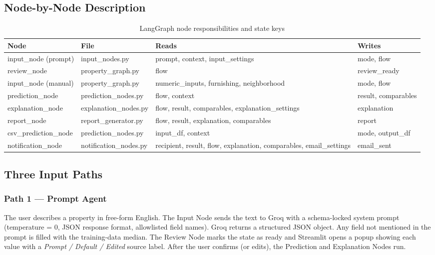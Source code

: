 \documentclass[12pt,a4paper]{article}
\begin{document}
\subsection{Node-by-Node Description}

\begin{table}[H]
\centering
\caption{LangGraph node responsibilities and state keys}
\begin{tabularx}{\linewidth}{llXX}
\toprule
\textbf{Node} & \textbf{File} & \textbf{Reads} & \textbf{Writes} \\
\midrule
input\_node (prompt) & input\_nodes.py & prompt, context, input\_settings & mode, flow \\
review\_node & property\_graph.py & flow & review\_ready \\
input\_node (manual) & property\_graph.py & numeric\_inputs, furnishing, neighborhood & mode, flow \\
prediction\_node & prediction\_nodes.py & flow, context & result, comparables \\
explanation\_node & explanation\_nodes.py & flow, result, comparables, explanation\_settings & explanation \\
report\_node & report\_generator.py & flow, result, explanation, comparables & report \\
csv\_prediction\_node & prediction\_nodes.py & input\_df, context & mode, output\_df \\
notification\_node & notification\_nodes.py & recipient, result, flow, explanation, comparables, email\_settings & email\_sent \\
\bottomrule
\end{tabularx}
\end{table}

\subsection{Three Input Paths}

\subsubsection{Path 1 --- Prompt Agent}
The user describes a property in free-form English. The Input Node sends the text to Groq with a schema-locked system prompt (temperature = 0, JSON response format, allowlisted field names). Groq returns a structured JSON object. Any field not mentioned in the prompt is filled with the training-data median. The Review Node marks the state as ready and Streamlit opens a popup showing each value with a \textit{Prompt / Default / Edited} source label. After the user confirms (or edits), the Prediction and Explanation Nodes run.
\end{document}
